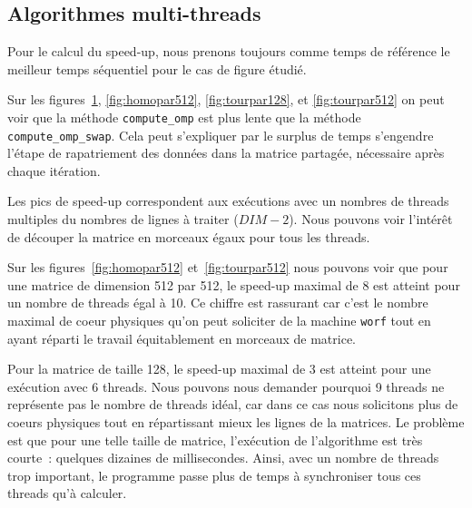 \subsection{Algorithmes multi-threads}

Pour le calcul du speed-up, nous prenons toujours comme temps de référence le
meilleur temps séquentiel pour le cas de figure étudié.
\bigskip

Sur les figures~\ref{fig:homopar128}, \ref{fig:homopar512},
\ref{fig:tourpar128}, et \ref{fig:tourpar512} on peut voir que la
méthode \texttt{compute\_omp} est plus lente que la méthode
\texttt{compute\_omp\_swap}. Cela peut s'expliquer par le surplus de
temps s'engendre l'étape de rapatriement des données dans la matrice
partagée, nécessaire après chaque itération.
\medskip

Les pics de speed-up correspondent aux exécutions avec un nombres de
threads multiples du nombres de lignes à traiter ($DIM-2$). Nous
pouvons voir l'intérêt de découper la matrice en morceaux égaux pour
tous les threads.
\medskip

Sur les figures~\ref{fig:homopar512} et~\ref{fig:tourpar512} nous
pouvons voir que pour une matrice de dimension 512 par 512, le speed-up
maximal de 8 est atteint pour un nombre de threads égal à 10. Ce
chiffre est rassurant car c'est le nombre maximal de coeur physiques qu'on peut
soliciter de la machine \texttt{worf} tout en ayant réparti le travail
équitablement en morceaux de matrice.
\medskip

Pour la matrice de taille 128, le speed-up maximal de 3 est atteint
pour une exécution avec 6 threads. Nous pouvons nous demander pourquoi
9 threads ne représente pas le nombre de threads idéal, car dans ce
cas nous solicitons plus de coeurs physiques tout en répartissant
mieux les lignes de la matrices. Le problème est que pour une telle
taille de matrice, l'exécution de l'algorithme est très courte~:
quelques dizaines de millisecondes. Ainsi, avec un nombre de threads
trop important, le programme passe plus de temps à synchroniser tous
ces threads qu'à calculer.
\medskip

\begin{figure}[!ht]
  \caption{}
  \label{fig:homopar128}
\end{figure}

